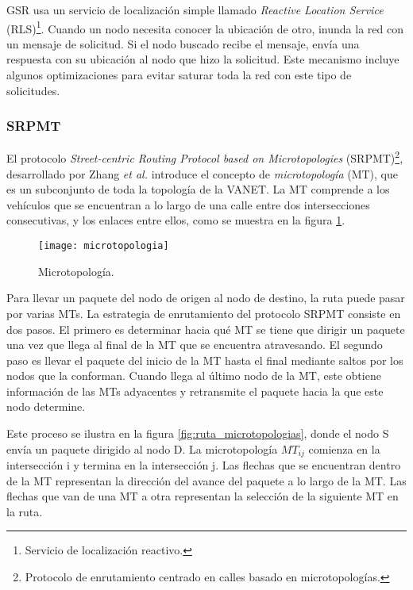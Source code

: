 GSR usa un servicio de localización simple llamado \textit{Reactive Location
Service} (RLS)\footnote{Servicio de localización reactivo.}. Cuando un nodo
necesita conocer la ubicación de otro, inunda la red con un mensaje de
solicitud. Si el nodo buscado recibe el mensaje, envía una respuesta con su
ubicación al nodo que hizo la solicitud. Este mecanismo incluye algunos
optimizaciones para evitar saturar toda la red con este tipo de solicitudes.

\subsubsection{SRPMT}
\label{subsubsec:srpmt}

El protocolo \textit{Street-centric Routing Protocol based on Microtopologies}
(SRPMT)\footnote{Protocolo de enrutamiento centrado en calles basado en
microtopologías.}, desarrollado por Zhang \textit{et al.} \cite{Zhang2016}
introduce el concepto de \textit{microtopología} (MT), que es un subconjunto de
toda la topología de la VANET. La MT comprende a los vehículos que se encuentran
a lo largo de una calle entre dos intersecciones consecutivas, y los enlaces
entre ellos, como se muestra en la figura \ref{fig:microtopologia}.

\begin{figure}[th]
\centering
\texttt{[image: microtopologia]}
\decoRule
\caption[Microtopología]{Microtopología\protect\footnotemark.}
\label{fig:microtopologia}
\end{figure}


Para llevar un paquete del nodo de origen al nodo de destino, la ruta puede
pasar por varias MTs. La estrategia de enrutamiento del protocolo SRPMT consiste
en dos pasos. El primero es determinar hacia qué MT se tiene que dirigir un
paquete una vez que llega al final de la MT que se encuentra atravesando. El
segundo paso es llevar el paquete del inicio de la MT hasta el final mediante
saltos por los nodos que la conforman. Cuando llega al último nodo de la MT,
este obtiene información de las MTs adyacentes y retransmite el paquete hacia
la que este nodo determine.

Este proceso se ilustra en la figura \ref{fig:ruta_microtopologias}, donde el
nodo S envía un paquete dirigido al nodo D. La microtopología $MT_{ij}$ comienza
en la intersección i y termina en la intersección j. Las flechas que se
encuentran dentro de la MT representan la dirección del avance del paquete a lo
largo de la MT. Las flechas que van de una MT a otra representan la selección
de la siguiente MT en la ruta.

